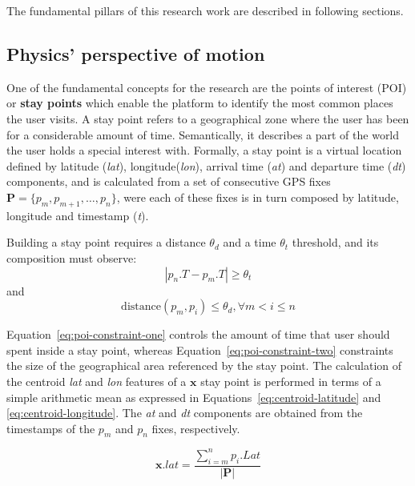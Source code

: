 \documentclass[ENG,PhD]{cinvestav}
\begin{document}
The fundamental pillars of this research work are described in following sections.

\subsection{Physics' perspective of motion}
One of the fundamental concepts for the research are the points of interest (POI) or \textbf{stay points} which enable the platform to identify the most common places the user visits.
A stay point refers to a geographical zone where the user has been for a considerable amount of time.
Semantically, it describes a part of the world the user holds a special interest with.
Formally, a stay point is a virtual location defined by latitude (\emph{lat}), longitude(\emph{lon}), arrival time (\emph{at}) and departure time (\emph{dt}) components, and is calculated from a set of consecutive GPS fixes $\mathbf{P}=\{p_{m},p_{m+1},\ldots,p_{n}\}$, were each of these fixes is in turn composed by latitude, longitude and timestamp (\emph{t}).

Building a stay point requires a distance $\theta_{d}$ and a time $\theta_{t}$ threshold, and its composition must observe:
\begin{equation}
  \left|p_{n}.T-p_{m}.T\right|\geq\theta_{t}
  \label{eq:poi-constraint-one}
\end{equation}
and
\begin{equation}
  \text{distance}(p_{m},p_{i})\leq\theta_{d}, \forall m<i\leq n
  \label{eq:poi-constraint-two}
\end{equation}

Equation~\ref{eq:poi-constraint-one} controls the amount of time that user should spent inside a stay point, whereas Equation~\ref{eq:poi-constraint-two} constraints the size of the geographical area referenced by the stay point.
The calculation of the centroid \emph{lat} and \emph{lon} features of a $\mathbf{x}$ stay point is performed in terms of a simple arithmetic mean as expressed in Equations~\ref{eq:centroid-latitude} and \ref{eq:centroid-longitude}.
The \emph{at} and \emph{dt} components are obtained from the timestamps of the $p_m$ and $p_n$ fixes, respectively.

\begin{equation}
\mathbf{x}.lat = \frac{ \sum_{i=m}^{n}p_{i}.Lat }{ |\mathbf{P}| }\label{eq:centroid-latitude}
\end{equation}
\end{document}

